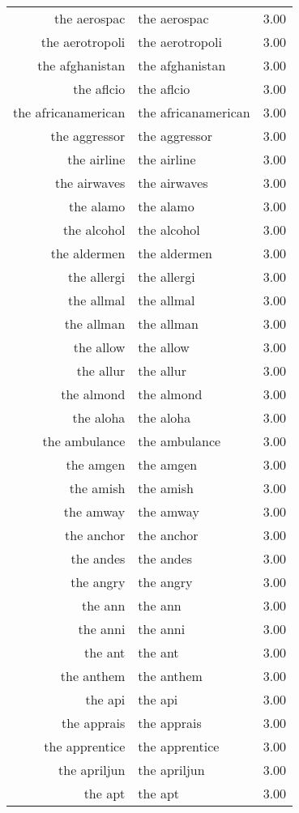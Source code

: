 \begin{table}[ht]
\begin{tabular}{rlr}
  the aerospac & the aerospac & 3.00 \\ 
  the aerotropoli & the aerotropoli & 3.00 \\ 
  the afghanistan & the afghanistan & 3.00 \\ 
  the aflcio & the aflcio & 3.00 \\ 
  the africanamerican & the africanamerican & 3.00 \\ 
  the aggressor & the aggressor & 3.00 \\ 
  the airline & the airline & 3.00 \\ 
  the airwaves & the airwaves & 3.00 \\ 
  the alamo & the alamo & 3.00 \\ 
  the alcohol & the alcohol & 3.00 \\ 
  the aldermen & the aldermen & 3.00 \\ 
  the allergi & the allergi & 3.00 \\ 
  the allmal & the allmal & 3.00 \\ 
  the allman & the allman & 3.00 \\ 
  the allow & the allow & 3.00 \\ 
  the allur & the allur & 3.00 \\ 
  the almond & the almond & 3.00 \\ 
  the aloha & the aloha & 3.00 \\ 
  the ambulance & the ambulance & 3.00 \\ 
  the amgen & the amgen & 3.00 \\ 
  the amish & the amish & 3.00 \\ 
  the amway & the amway & 3.00 \\ 
  the anchor & the anchor & 3.00 \\ 
  the andes & the andes & 3.00 \\ 
  the angry & the angry & 3.00 \\ 
  the ann & the ann & 3.00 \\ 
  the anni & the anni & 3.00 \\ 
  the ant & the ant & 3.00 \\ 
  the anthem & the anthem & 3.00 \\ 
  the api & the api & 3.00 \\ 
  the apprais & the apprais & 3.00 \\ 
  the apprentice & the apprentice & 3.00 \\ 
  the apriljun & the apriljun & 3.00 \\ 
  the apt & the apt & 3.00 \\ 

\end{tabular}
\end{table}

